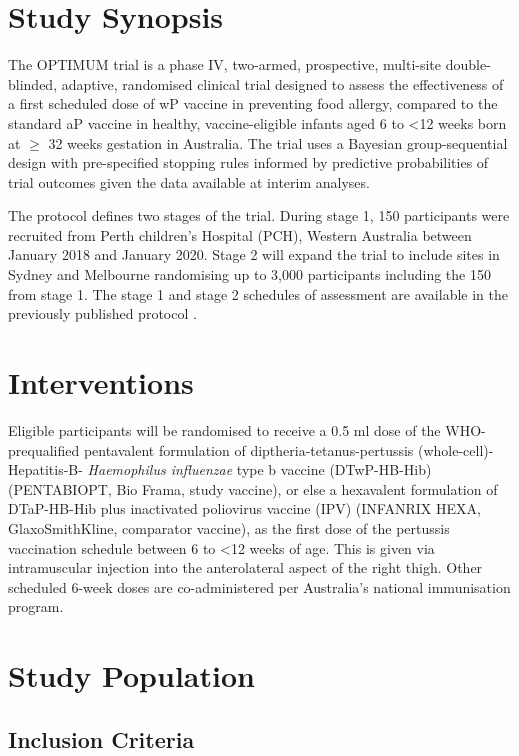 \documentclass{bmcart}
\begin{document}
\section*{Study Synopsis}

The OPTIMUM trial is a phase IV, two-armed, prospective, multi-site double-blinded, adaptive, randomised clinical trial designed to assess the effectiveness of a first scheduled dose of wP vaccine in preventing food allergy, compared to the standard aP vaccine in healthy, vaccine-eligible infants aged 6 to \textless12 weeks born at \(\geq\) 32 weeks gestation in Australia.
The trial uses a Bayesian group-sequential design with pre-specified stopping rules informed by predictive probabilities of trial outcomes given the data available at interim analyses.

The protocol defines two stages of the trial.
During stage 1, 150 participants were recruited from Perth children's Hospital (PCH), Western Australia between January 2018 and January 2020.
Stage 2 will expand the trial to include sites in Sydney and Melbourne randomising up to 3,000 participants including the 150 from stage 1.
The stage 1 and stage 2 schedules of assessment are available in the previously published protocol \cite{perez2020}.

\section*{Interventions}

Eligible participants will be randomised to receive a 0.5 ml dose of the WHO-prequalified pentavalent formulation of diptheria-tetanus-pertussis (whole-cell)-Hepatitis-B- \textit{Haemophilus influenzae} type b vaccine (DTwP-HB-Hib) (PENTABIO\textregistered PT, Bio Frama, study vaccine), or else a hexavalent formulation of DTaP-HB-Hib plus inactivated poliovirus vaccine (IPV) (INFANRIX HEXA\textregistered, GlaxoSmithKline, comparator vaccine), as the first dose of the pertussis vaccination schedule between 6 to \textless 12 weeks of age.
This is given via intramuscular injection into the anterolateral aspect of the right thigh.
Other scheduled 6-week doses are co-administered per Australia's national immunisation program.

\section*{Study Population}

\subsection*{Inclusion Criteria}
\end{document}
